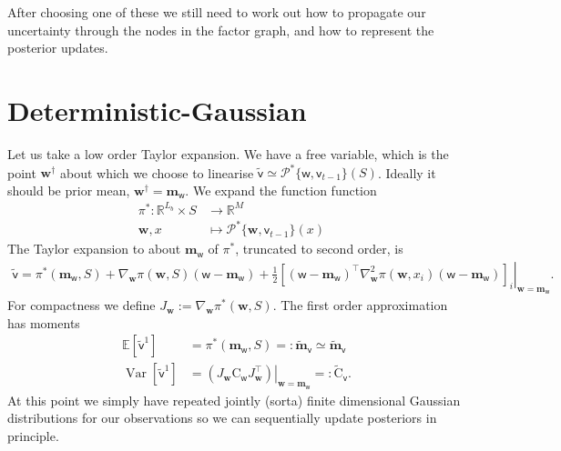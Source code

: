 \documentclass{article}
\newcommand{\var}{\operatorname{Var}}
\newcommand{\vv}[1]{\boldsymbol{#1}}
\newcommand{\mm}[1]{\mathrm{#1}}
\newcommand{\rv}[1]{\mathsf{#1}}
\newcommand{\vrv}[1]{\vv{\rv{#1}}}
\newcommand{\set}[1]{#1}
\newcommand{\op}[1]{\mathscr{#1}}
\newcommand{\Ex}{\mathbb{E}}
\newcommand{\latwt}{\vrv{w}}
\newcommand{\latwtst}{\vv{w}}
\begin{document}
After choosing one of these we still need to work out how to propagate our uncertainty through the nodes in the factor graph, and how to represent the posterior updates.

\section{Deterministic-Gaussian}

Let us take a low order Taylor expansion.
We have a free variable, which is the point \(\vv{w}^\dagger\) about which we choose to linearise \(\tilde{\vrv{v}}\simeq \op{P}^*\{\latwt,\rv{v}_{t-1}\}(\set{S})\). 
Ideally it should be prior mean, \(\vv{w}^\dagger=\vv{m}_{\latwt}\).
We expand the function
function \begin{align*}
\pi^*:\mathbb{R}^{L_b}\times\set{S}&\to\mathbb{R}^{M}&\\
\latwtst,x &\mapsto \op{P}^*\{\latwtst,\rv{v}_{t-1}\}(x)&
\end{align*}
The Taylor expansion to about \(\vv{m}_{\latwt}\) of \(\pi^*\), truncated to second order, is
\begin{align*}
    \tilde{\vrv{v}}=\left. \pi^*(\vv{m}_{\latwt},\set{S}) +\nabla_{\latwtst} \pi(\latwtst, \set{S})(\latwt-\vv{m}_{\latwt})+\frac12\left[
        (\latwt-\vv{m}_{\latwt})^\top\nabla^2_{\latwtst}\pi(\latwtst,x_i)(\latwt-\vv{m}_{\latwt})
    \right]_{i} \right|_{\latwtst=\vv{m}_{\latwt}}.
\end{align*}
For compactness we define \(J_{\latwtst}:=\nabla_{\latwtst} \pi^*(\latwtst,\set{S}).\) 
The first order approximation has moments
\begin{align*}
    \Ex[\tilde{\vrv{v}}^1] &=
    \pi^*(\vv{m}_{\latwt},\set{S})=:\tilde{\vv{m}}_{\vrv{v}}\simeq \tilde{\vv{m}}_{\vrv{v}}\\
    \var[\tilde{\vrv{v}}^1] &= \left.\left(J_{\latwtst}\mm{C}_{\latwt} J_{\latwtst}^\top\right)\right|_{\latwtst=\vv{m}_{\latwt}}=:\tilde{\mm{C}}_{\vrv{v}}.
\end{align*}
At this point we simply have repeated jointly (sorta) finite dimensional Gaussian distributions for our observations so we can sequentially update posteriors in principle.
\end{document}
